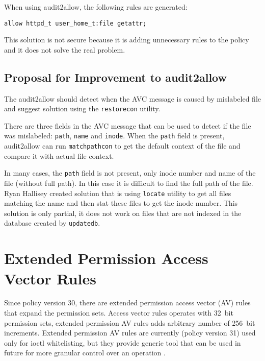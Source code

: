 When using audit2allow, the following rules are generated:
\begin{lstlisting}
allow httpd_t user_home_t:file getattr;
\end{lstlisting}
This solution is not secure because it is adding unnecessary rules to the policy
and it does not solve the real problem.

\subsection{Proposal for Improvement to audit2allow}
The audit2allow should detect when the AVC message is caused by mislabeled file
and suggest solution using the \texttt{restorecon} utility.

There are three fields in the AVC message that can be used to detect if the file
was mislabeled: \texttt{path}, \texttt{name} and \texttt{inode}. When the
\texttt{path} field is present, audit2allow can run \texttt{matchpathcon} to get
the default context of the file and compare it with actual file context.

In many cases, the \texttt{path} field is not present, only inode number and
name of the file (without full path). In this case it is difficult to find the
full path of the file. Ryan Hallisey created solution \cite{restoreconpullreq}
that is using \texttt{locate} utility to get all files matching the name and
then stat these files to get the inode number. This solution is only partial, it
does not work on files that are not indexed in the database created by
\texttt{updatedb}.

\section{Extended Permission Access Vector Rules}
Since policy version 30, there are extended permission access vector (AV) rules
that expand the permission sets. Access vector rules operates with 32~bit
permission sets, extended permission AV rules adds arbitrary number of 256~bit
increments. Extended permission AV rules are currently (policy version 31) used
only for ioctl whitelisting, but they provide generic tool that can be used in
future for more granular control over an operation \cite{selinuxmailxperms}.

